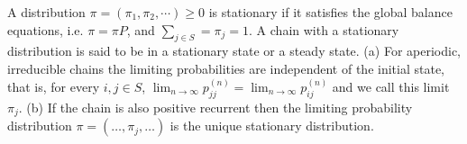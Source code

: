  A distribution $\pi = (\pi_1,\pi_2,\cdots) \ge 0$ is stationary if it satisfies the global balance equations, i.e. $\pi = \pi P$, and $\sum_{j \in S} = \pi_j = 1$. A chain with a stationary distribution is said to be in a stationary state or a steady state.
(a) For aperiodic, irreducible chains the limiting probabilities are independent of the initial state, that is, for every $i, j \in S$, $\lim_{n \to \infty} p^{(n)}_{jj} = \lim_{n \to \infty} p^{(n)}_{ij}$ and we call this limit $\pi_j$. 
(b) If the chain is also positive recurrent then the limiting probability distribution $\pi = (\ldots, \pi_j, \ldots)$ is the unique stationary distribution.